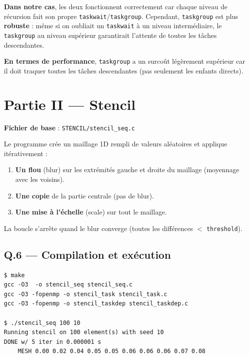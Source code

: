 \documentclass[12pt,a4paper]{article}
\begin{document}
\textbf{Dans notre cas}, les deux fonctionnent correctement car chaque niveau de
récursion fait son propre \texttt{taskwait}/\texttt{taskgroup}. Cependant,
\texttt{taskgroup} est plus \textbf{robuste} : même si on oubliait un
\texttt{taskwait} à un niveau intermédiaire, le \texttt{taskgroup} au niveau
supérieur garantirait l'attente de toutes les tâches descendantes.

\textbf{En termes de performance}, \texttt{taskgroup} a un surcoût légèrement
supérieur car il doit traquer toutes les tâches descendantes (pas seulement les
enfants directs).

\newpage
\section{Partie II --- Stencil}

\textbf{Fichier de base} : \texttt{STENCIL/stencil\_seq.c}

Le programme crée un maillage 1D rempli de valeurs aléatoires et applique
itérativement :
\begin{enumerate}
  \item \textbf{Un flou} (blur) sur les extrémités gauche et droite du maillage
    (moyennage avec les voisins).
  \item \textbf{Une copie} de la partie centrale (pas de blur).
  \item \textbf{Une mise à l'échelle} (scale) sur tout le maillage.
\end{enumerate}
La boucle s'arrête quand le blur converge (toutes les différences $<$
\texttt{threshold}).

\subsection{Q.6 --- Compilation et exécution}

\begin{lstlisting}[style=bashstyle, caption={Compilation et exécution}]
$ make
gcc -O3  -o stencil_seq stencil_seq.c
gcc -O3 -fopenmp -o stencil_task stencil_task.c
gcc -O3 -fopenmp -o stencil_taskdep stencil_taskdep.c

$ ./stencil_seq 100 10
Running stencil on 100 element(s) with seed 10
DONE w/ 5 iter in 0.000001 s
    MESH 0.00 0.02 0.04 0.05 0.05 0.06 0.06 0.06 0.07 0.08
\end{lstlisting}
\end{document}
